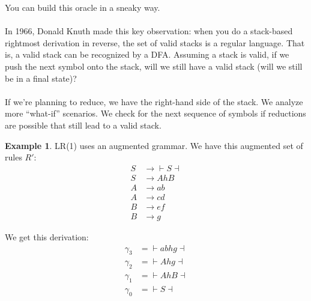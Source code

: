 \documentclass[]{article}
\theoremstyle{definition}
\newtheorem{ex}{Example}[section]
\begin{document}
				You can build this oracle in a sneaky way. 
				\\ \\
				In 1966, Donald Knuth made this key observation: when you do a stack-based rightmost derivation in reverse, the set of valid stacks is a regular language. That is, a valid stack can be recognized by a DFA. Assuming a stack is valid, if we push the next symbol onto the stack, will we still have a valid stack (will we still be in a final state)?
				\\ \\
				If we're planning to reduce, we have the right-hand side of the stack. We analyze more ``what-if'' scenarios. We check for the next sequence of symbols if reductions are possible that still lead to a valid stack.
				\begin{ex}
					LR(1) uses an augmented grammar. We have this augmented set of rules $R'$:
					\begin{align*}
						S &\to{} \vdash S \dashv \\
						S &\to AhB \\
						A &\to ab \\
						A &\to cd \\
						B &\to ef \\
						B &\to g
					\end{align*}

					We get this derivation:
					\begin{align*}
						\gamma_3 &={} \vdash abhg \dashv \\
						\gamma_2 &={} \vdash Ahg \dashv \\
						\gamma_1 &={} \vdash AhB \dashv \\
						\gamma_0 &={} \vdash S \dashv
					\end{align*}


\end{ex}
\end{document}
